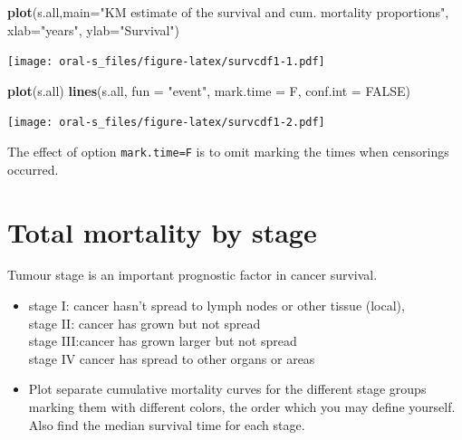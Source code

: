 \documentclass[
]{book}
\newenvironment{Shaded}{\begin{snugshade}}{\end{snugshade}}
\newcommand{\AttributeTok}[1]{\textcolor[rgb]{0.13,0.29,0.53}{#1}}
\newcommand{\ConstantTok}[1]{\textcolor[rgb]{0.56,0.35,0.01}{#1}}
\newcommand{\FunctionTok}[1]{\textcolor[rgb]{0.13,0.29,0.53}{\textbf{#1}}}
\newcommand{\NormalTok}[1]{#1}
\newcommand{\StringTok}[1]{\textcolor[rgb]{0.31,0.60,0.02}{#1}}
\begin{document}
\begin{Shaded}
\begin{Highlighting}[]
\FunctionTok{plot}\NormalTok{(s.all,}\AttributeTok{main=}\StringTok{"KM estimate of the survival}
\StringTok{     and cum. mortality proportions"}\NormalTok{,}
     \AttributeTok{xlab=}\StringTok{"years"}\NormalTok{, }\AttributeTok{ylab=}\StringTok{"Survival"}\NormalTok{)}
\end{Highlighting}
\end{Shaded}

\texttt{[image: oral-s\_files/figure-latex/survcdf1-1.pdf]}

\begin{Shaded}
\begin{Highlighting}[]
\FunctionTok{plot}\NormalTok{(s.all)}
\FunctionTok{lines}\NormalTok{(s.all, }\AttributeTok{fun =} \StringTok{"event"}\NormalTok{, }\AttributeTok{mark.time =}\NormalTok{ F, }\AttributeTok{conf.int =} \ConstantTok{FALSE}\NormalTok{)}
\end{Highlighting}
\end{Shaded}

\texttt{[image: oral-s\_files/figure-latex/survcdf1-2.pdf]}

The effect of option \texttt{mark.time=F} is to omit
marking the times when censorings occurred.

\section{Total mortality by stage}\label{total-mortality-by-stage}

Tumour stage is an important prognostic factor in cancer survival.

\begin{itemize}
\item
  stage I: cancer hasn't spread to lymph nodes or other tissue (local),\\
  stage II: cancer has grown but not spread\\
  stage III:cancer has grown larger but not spread\\
  stage IV cancer has spread to other organs or areas
\item
  Plot separate cumulative mortality curves for the different stage groups
  marking them with different colors, the order which you may define yourself.
  Also find the median survival time for each stage.
\end{itemize}
\end{document}
